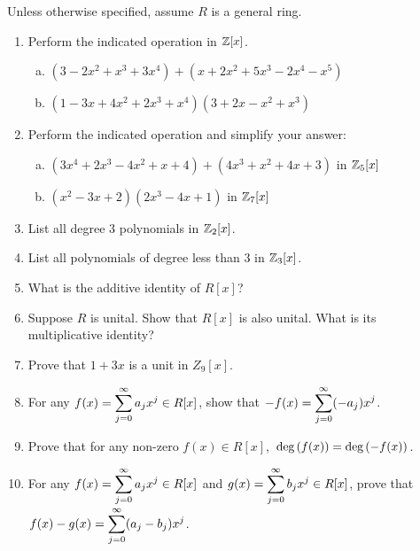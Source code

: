 \documentclass[11pt,fleqn,dvipsnames,usenames]{article}
\renewcommand{\headrulewidth}{1pt}
\newcommand{\p}{\noindent}
\begin{document}
\fancyhead[L]{\course}
\fancyhead[R]{\term}
\renewcommand{\headrulewidth}{0.4pt}

\p {\huge \S5.1 Problems}
\vsp

\note Unless otherwise specified, assume $R$ is a general ring.

\begin{enumerate}[1.]
\item Perform the indicated operation in $\mathbb{Z}[x]$.
\begin{enumerate}[(a)]
\item $(3 - 2x^2 + x^3 + 3x^4) + (x + 2x^2 + 5x^3 - 2x^4 - x^5)$
\item $(1 - 3x + 4x^2 + 2x^3 + x^4)(3 + 2x - x^2 + x^3)$
\end{enumerate}

\item Perform the indicated operation and simplify your answer:
\begin{enumerate}[(a)]
\item $(3x^4 + 2x^3 - 4x^2 + x + 4) + (4x^3 + x^2 + 4x + 3)$ in $\mathbb{Z}_{5}[x]$
\item $(x^2 - 3x + 2)(2x^3 - 4x + 1)$ in $\mathbb{Z}_{7}[x]$
\end{enumerate}

\item List all degree $3$ polynomials in $\mathbb{Z}_{2}[x]$.

\item List all polynomials of degree less than $3$ in $\mathbb{Z}_{3}[x]$.

\item What is the additive identity of $R[x]$?

\item Suppose $R$ is unital.  Show that $R[x]$ is also unital.  What is its multiplicative identity?

\item Prove that $1+3x$ is a unit in $Z_{9}[x]$.

\item For any $f(x)=\displaystyle\sum\limits_{j=0}^{\infty}a_{j}x^{j}\in R[x]$, show that $-f(x) = \displaystyle\sum\limits_{j=0}^{\infty}(-a_{j})x^{j}$.

\item Prove that for any non-zero $f(x)\in R[x]$, $\text{deg}\left(f(x)\right) = \text{deg}\left(-f(x)\right)$.

\item For any $f(x)=\displaystyle\sum\limits_{j=0}^{\infty}a_{j}x^{j}\in R[x]$ and $g(x)=\displaystyle\sum\limits_{j=0}^{\infty}b_{j}x^{j}\in R[x]$, prove that $f(x) - g(x) = \displaystyle\sum\limits_{j=0}^{\infty}(a_{j}-b_{j})x^{j}$.


\end{enumerate}
\end{document}

